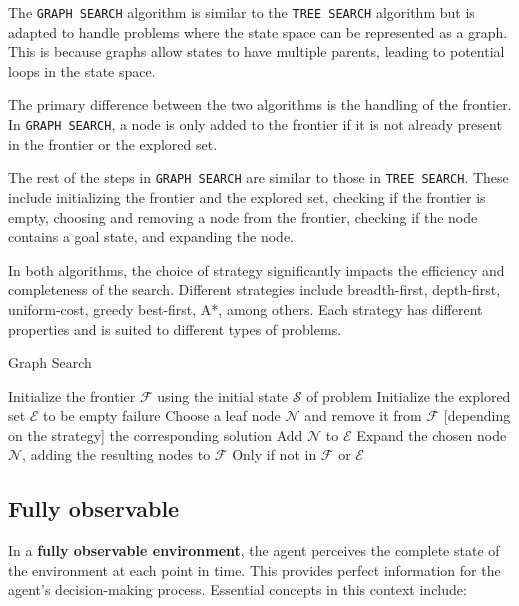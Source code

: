 \documentclass[a4paper,UKenglish,cleveref, autoref, thm-restate]{qlinhta}
\begin{document}
    The \texttt{GRAPH SEARCH} algorithm is similar to the \texttt{TREE SEARCH} algorithm but is adapted to handle problems where the state space can be represented as a graph. This is because graphs allow states to have multiple parents, leading to potential loops in the state space.

    The primary difference between the two algorithms is the handling of the frontier. In \texttt{GRAPH SEARCH}, a node is only added to the frontier if it is not already present in the frontier or the explored set.

    The rest of the steps in \texttt{GRAPH SEARCH} are similar to those in \texttt{TREE SEARCH}. These include initializing the frontier and the explored set, checking if the frontier is empty, choosing and removing a node from the frontier, checking if the node contains a goal state, and expanding the node.

    In both algorithms, the choice of strategy significantly impacts the efficiency and completeness of the search. Different strategies include breadth-first, depth-first, uniform-cost, greedy best-first, A*, among others. Each strategy has different properties and is suited to different types of problems.
    \begin{algorithm}[H]
        \caption{Graph Search}\label{alg:graph_search}
        \begin{algorithmic}[1]
                \State Initialize the frontier $\mathcal{F}$ using the initial state $\mathcal{S}$ of problem
                \State Initialize the explored set $\mathcal{E}$ to be empty
                        \State \Return failure
                    \EndIf
                    \State Choose a leaf node $\mathcal{N}$ and remove it from $\mathcal{F}$ [depending on the strategy]
                        \State \Return the corresponding solution
                    \EndIf
                    \State Add $\mathcal{N}$ to $\mathcal{E}$
                    \State Expand the chosen node $\mathcal{N}$, adding the resulting nodes to $\mathcal{F}$
                    \State Only if not in $\mathcal{F}$ or $\mathcal{E}$
                \EndWhile
            \EndProcedure
        \end{algorithmic}
    \end{algorithm}

    \subsection{Fully observable}
    In a \textbf{fully observable environment}, the agent perceives the complete state of the environment at each point in time. This provides perfect information for the agent's decision-making process. Essential concepts in this context include:
\end{document}
